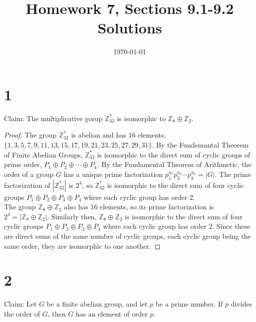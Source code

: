 \documentclass{article}
\title{\textbf{Homework 7, Sections 9.1-9.2 Solutions}}
\date{}
\date\today
\begin{document}
\maketitle %

\thispagestyle{firstpage}
\section*{1}

Claim: The multiplicative gorup $\mathbb{Z}_{32}^*$ is isomorphic to $\mathbb{Z}_8 \oplus \mathbb{Z}_2$.

\begin{proof}
    The group $\mathbb{Z}_{32}^*$ is abelian and has 16 elements, $\{1, 3, 5, 7, 9, 11, 13, 15, 17, 19, 21, 23, 25, 27, 29, 31 \}$.  
    By the Fundemantal Theorem of Finite Abelian Groups, $\mathbb{Z}_{32}^*$ is isomorphic to the direct sum of 
    cyclic groups of prime order, $P_1 \oplus P_2 \oplus \cdots \oplus P_k$.  By the Fundamental Theorem of Arithmetic, 
    the order of a group $G$ has a unique prime factorization $p_1^{a_1} p_2^{a_2} \cdots p_k^{a_k} = |G|$.  The prime factorization of 
    $| \mathbb{Z}_{32}^* |$ is $2^4$, so $\mathbb{Z}_{32}^*$ is isomorphic to the direct sum of four cyclic groups 
    $P_1 \oplus P_2 \oplus P_3 \oplus P_4$ where each cyclic group has order 2. \\ 

    The group $\mathbb{Z}_8 \oplus \mathbb{Z}_2$ also has 16 elements, so its prime factorization is $2^4 = | \mathbb{Z}_8 \oplus \mathbb{Z}_2 |$.  
    Similarly then, $\mathbb{Z}_8 \oplus \mathbb{Z}_2$ is isomorphic to the direct sum of four cyclic groups $P_1 \oplus P_2 \oplus P_3 \oplus P_4$ 
    where each cyclic group has order 2.  Since these are direct sums of the same number of cyclic groups, each cyclic group being the same order, they 
    are isomorphic to one another.
\end{proof}


\section*{2}

Claim: Let $G$ be a finite abelian group, and let $p$ be a prime number.  If $p$ divides the order of $G$, then $G$ has 
an element of order $p$.
\end{document}
